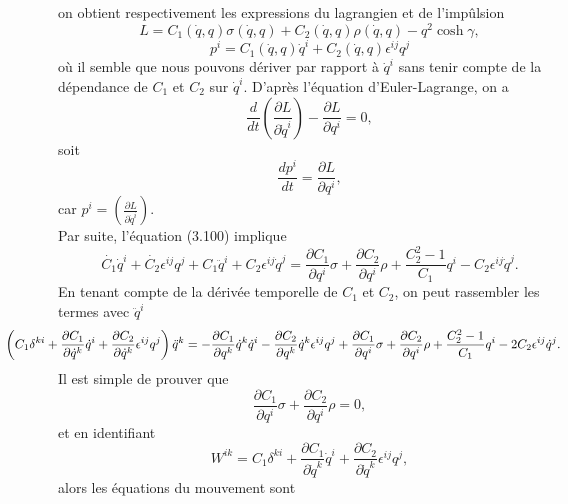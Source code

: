 \documentclass[12pt,a4paper, openany]{report}
\begin{document}
	on obtient respectivement les expressions du lagrangien et de l'impûlsion 
	\begin{equation}
		L=C_1(\dot{q}, q )\sigma(\dot{q}, q )+C_2(\dot{q}, q )\rho(\dot{q}, q )-q^{2}\cosh{\gamma},	
	\end{equation}
	\begin{equation}
		p^i=C_1(\dot{q}, q )\dot{q}^i+C_2(\dot{q}, q )\epsilon^{ij}q^j
	\end{equation} où il semble que nous pouvons dériver par rapport à $\dot{q}^i$ sans tenir compte de la dépendance de $C_1$ et $C_2$ sur $\dot{q}^i$. D'après l'équation d'Euler-Lagrange, on a 
	\begin{equation}
		\frac{d}{dt}\left(\frac{\partial L}{\partial \dot{q}^i}\right)-\frac{\partial L}{\partial q^i}=0	,
	\end{equation}
	soit
	\begin{equation}
		\frac{dp^i}{dt}=\frac{\partial L}{\partial q^i},	
	\end{equation}
	car $p^i=\left(\frac{\partial L}{\partial \dot{q}^i}\right)$.\\
	Par suite, l'équation (3.100) implique
	\begin{equation}
		\dot{C_1}\dot{q}^i+\dot{C_2}\epsilon^{ij}q^j+C_1\ddot{q}^i+C_2\epsilon^{ij
		}\dot{q}^j=\frac{\partial C_1}{\partial q^i}\sigma+\frac{\partial C_2}{\partial q^i}\rho +\frac{C^{2}_2-1}{C_1}q^i -C_2\epsilon^{ij}\dot{q}^j  .
	\end{equation} En tenant compte de la dérivée temporelle de $C_1$ et $C_2$, on peut rassembler les termes avec $\ddot{q}^i $
	\begin{equation}
		\hspace{-1.5cm}	\left(C_1\delta^{ki}+\frac{\partial C_1}{\partial\dot{q}^k}\dot{q}^i+\frac{\partial C_2}{\partial\dot{q}^k}\epsilon^{ij}q^j\right)\ddot{q}^k=-\frac{\partial C_1}{\partial {q}^k}\dot{q}^k\dot{q}^i-\frac{\partial C_2}{\partial{q}^k}\dot{q}^k\epsilon^{ij}q^j+\frac{\partial C_1}{\partial q^i}\sigma+\frac{\partial C_2}{\partial q^i}\rho+\frac{C^{2}_2-1}{C_1}q^i -2C_2\epsilon^{ij}\dot{q}^j .
	\end{equation} Il est simple de prouver que 
	\begin{equation}
		\frac{\partial C_1}{\partial q^i}\sigma+\frac{\partial C_2}{\partial q^i}\rho =0	,
	\end{equation} et en identifiant 
	\begin{equation}
		W^{ik}=C_1\delta^{ki}+\frac{\partial C_1}{\partial\dot{q}^k}\dot{q}^i+\frac{\partial C_2}{\partial\dot{q}^k}\epsilon^{ij}q^j,
	\end{equation} alors les équations du mouvement sont 
\end{document}
